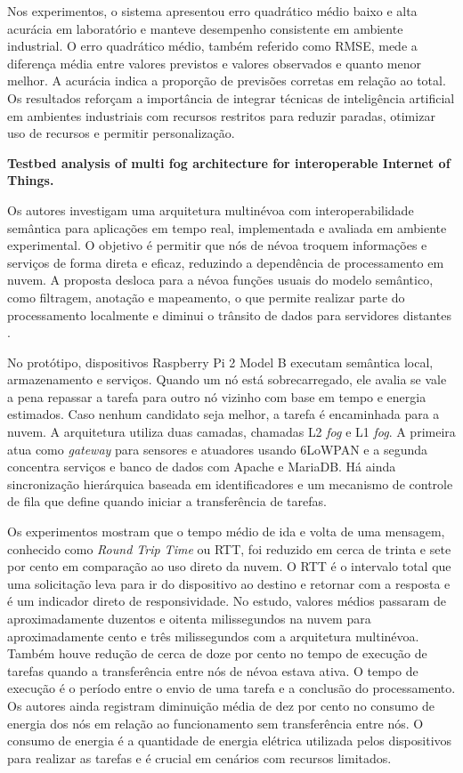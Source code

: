 Nos experimentos, o sistema apresentou erro quadrático médio baixo e alta acurácia em laboratório e manteve desempenho consistente em ambiente industrial. O erro quadrático médio, também referido como \gls{RMSE}, mede a diferença média entre valores previstos e valores observados e quanto menor melhor. A acurácia indica a proporção de previsões corretas em relação ao total. Os resultados reforçam a importância de integrar técnicas de inteligência artificial em ambientes industriais com recursos restritos para reduzir paradas, otimizar uso de recursos e permitir personalização.

\textbf{Testbed analysis of multi fog architecture for interoperable Internet of Things.}

Os autores investigam uma arquitetura multinévoa com interoperabilidade semântica para aplicações em tempo real, implementada e avaliada em ambiente experimental. O objetivo é permitir que nós de névoa troquem informações e serviços de forma direta e eficaz, reduzindo a dependência de processamento em nuvem. A proposta desloca para a névoa funções usuais do modelo semântico, como filtragem, anotação e mapeamento, o que permite realizar parte do processamento localmente e diminui o trânsito de dados para servidores distantes \cite{rahman2024}.

No protótipo, dispositivos Raspberry Pi 2 Model B executam semântica local, armazenamento e serviços. Quando um nó está sobrecarregado, ele avalia se vale a pena repassar a tarefa para outro nó vizinho com base em tempo e energia estimados. Caso nenhum candidato seja melhor, a tarefa é encaminhada para a nuvem. A arquitetura utiliza duas camadas, chamadas \gls{L2} \textit{fog} e \gls{L1} \textit{fog}. A primeira atua como \textit{gateway} para sensores e atuadores usando 6LoWPAN e a segunda concentra serviços e banco de dados com Apache e MariaDB. Há ainda sincronização hierárquica baseada em identificadores e um mecanismo de controle de fila que define quando iniciar a transferência de tarefas.

Os experimentos mostram que o tempo médio de ida e volta de uma mensagem, conhecido como \textit{Round Trip Time} ou \gls{RTT}, foi reduzido em cerca de trinta e sete por cento em comparação ao uso direto da nuvem. O \gls{RTT} é o intervalo total que uma solicitação leva para ir do dispositivo ao destino e retornar com a resposta e é um indicador direto de responsividade. No estudo, valores médios passaram de aproximadamente duzentos e oitenta milissegundos na nuvem para aproximadamente cento e três milissegundos com a arquitetura multinévoa. Também houve redução de cerca de doze por cento no tempo de execução de tarefas quando a transferência entre nós de névoa estava ativa. O tempo de execução é o período entre o envio de uma tarefa e a conclusão do processamento. Os autores ainda registram diminuição média de dez por cento no consumo de energia dos nós em relação ao funcionamento sem transferência entre nós. O consumo de energia é a quantidade de energia elétrica utilizada pelos dispositivos para realizar as tarefas e é crucial em cenários com recursos limitados.

